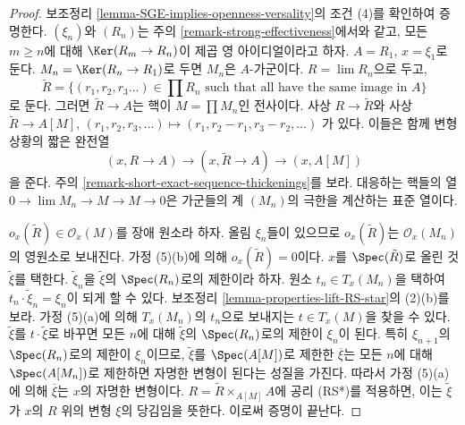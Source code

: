 \begin{proof}
보조정리 \ref{lemma-SGE-implies-openness-versality}의 조건 (4)를
확인하여 증명한다.
$(\xi_n)$와 $(R_n)$는 주의 \ref{remark-strong-effectiveness}에서와
같고, 모든 $m \geq n$에 대해 $\Ker(R_m \to R_n)$이 제곱 영 아이디얼이라고
하자. $A = R_1$, $x = \xi_1$로 둔다.
$M_n = \Ker(R_n \to R_1)$로 두면 $M_n$은 $A$-가군이다.
$R = \lim R_n$으로 두고,
$$
\tilde R = \{(r_1, r_2, r_3 \ldots) \in \prod R_n
\text{ such that all have the same image in }A\}
$$
로 둔다. 그러면 $\tilde R \to A$는 핵이 $M = \prod M_n$인 전사이다.
사상 $R \to \tilde R$와 사상
$\tilde R \to A[M]$, $(r_1, r_2, r_3, \ldots) \mapsto
(r_1, r_2 - r_1, r_3 - r_2, \ldots)$
가 있다. 이들은 함께 변형 상황의 짧은 완전열
$$
(x, R \to A) \to (x, \tilde R \to A) \to (x, A[M])
$$
을 준다. 주의 \ref{remark-short-exact-sequence-thickenings}를 보라.
대응하는 핵들의 열 $0 \to \lim M_n \to M \to M \to 0$은
가군들의 계 $(M_n)$의 극한을 계산하는 표준 열이다.

\medskip\noindent
$o_x(\tilde R) \in \mathcal{O}_x(M)$를 장애 원소라 하자.
올림 $\xi_n$들이 있으므로 $o_x(\tilde R)$는 $\mathcal{O}_x(M_n)$의
영원소로 보내진다. 가정 (5)(b)에 의해 $o_x(\tilde R) = 0$이다.
$x$를 $\Spec(\tilde R)$로 올린 것 $\tilde \xi$를 택한다.
$\tilde \xi_n$을 $\tilde \xi$의 $\Spec(R_n)$로의 제한이라 하자.
원소 $t_n \in T_x(M_n)$을 택하여 $t_n \cdot \tilde \xi_n = \xi_n$이
되게 할 수 있다. 보조정리 \ref{lemma-properties-lift-RS-star}의
(2)(b)를 보라. 가정 (5)(a)에 의해 $T_x(M_n)$의 $t_n$으로 보내지는
$t \in T_x(M)$을 찾을 수 있다.
$\tilde \xi$를 $t \cdot \tilde \xi$로 바꾸면 모든 $n$에 대해
$\tilde \xi$의 $\Spec(R_n)$로의 제한이 $\xi_n$이 된다.
특히 $\xi_{n + 1}$의 $\Spec(R_n)$로의 제한이 $\xi_n$이므로,
$\tilde \xi$를 $\Spec(A[M])$로 제한한 $\overline{\xi}$는 모든 $n$에 대해
$\Spec(A[M_n])$로 제한하면 자명한 변형이 된다는 성질을 가진다.
따라서 가정 (5)(a)에 의해 $\overline{\xi}$는 $x$의 자명한 변형이다.
$R = \tilde R \times_{A[M]} A$에 공리 (RS*)를 적용하면,
이는 $\tilde \xi$가 $x$의 $R$ 위의 변형 $\xi$의 당김임을 뜻한다.
이로써 증명이 끝난다.
\end{proof}

